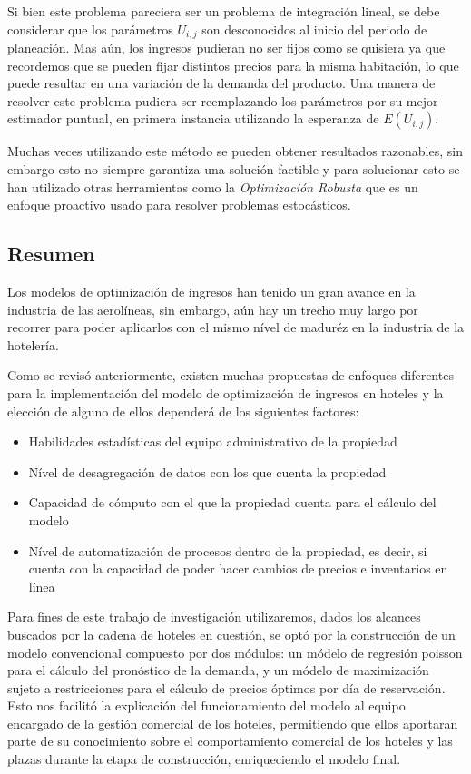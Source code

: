 {{{Si bien este problema pareciera ser un problema de integración lineal, se debe considerar que los parámetros $U_{i,j}$ son desconocidos al inicio del periodo de planeación. Mas aún, los ingresos pudieran no ser fijos como se quisiera ya que recordemos que se pueden fijar distintos precios para la misma habitación, lo que puede resultar en una variación de la demanda del producto. Una manera de resolver este problema pudiera ser reemplazando los parámetros por su mejor estimador puntual, en primera instancia utilizando la esperanza de $E(U_{i,j})$.

Muchas veces utilizando este método se pueden obtener resultados razonables, sin embargo esto no siempre garantiza una solución factible y para solucionar esto se han utilizado otras herramientas como la \emph{Optimización Robusta} que es un enfoque proactivo usado para resolver problemas estocásticos.

\subsection*{Resumen}

Los modelos de optimización de ingresos han tenido un gran avance en la industria de las aerolíneas, sin embargo, aún hay un trecho muy largo por recorrer para poder aplicarlos con el mismo nível de maduréz en la industria de la hotelería.

Como se revisó anteriormente, existen muchas propuestas de enfoques diferentes para la implementación del modelo de optimización de ingresos en hoteles y la elección de alguno de ellos dependerá de los siguientes factores:

\begin{itemize}
  \item Habilidades estadísticas del equipo administrativo de la propiedad
  \item Nível de desagregación de datos con los que cuenta la propiedad
  \item Capacidad de cómputo con el que la propiedad cuenta para el cálculo del modelo
  \item Nível de automatización de procesos dentro de la propiedad, es decir, si cuenta con la capacidad de poder hacer cambios de precios e inventarios en línea
\end{itemize}

Para fines de este trabajo de investigación utilizaremos, dados los alcances buscados por la cadena de hoteles en cuestión, se optó por la construcción de un modelo convencional compuesto por dos módulos: un módelo de regresión poisson para el cálculo del pronóstico de la demanda, y un módelo de maximización sujeto a restricciones para el cálculo de precios óptimos por día de reservación. Esto nos facilitó la explicación del funcionamiento del modelo al equipo encargado de la gestión comercial de los hoteles, permitiendo que ellos aportaran parte de su conocimiento sobre el comportamiento comercial de los hoteles y las plazas durante la etapa de construcción, enriqueciendo el modelo final.

}}}

